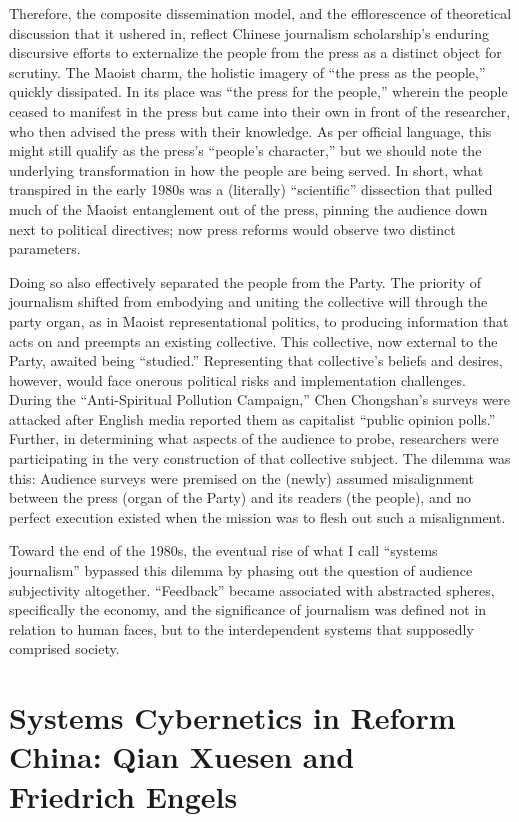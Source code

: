 \documentclass{tufte-handout}
\begin{document}
Therefore, the composite dissemination model, and the efflorescence of
theoretical discussion that it ushered in, reflect Chinese journalism
scholarship's enduring discursive efforts to externalize the people from
the press as a distinct object for scrutiny. The Maoist charm, the
holistic imagery of ``the press as the people,'' quickly dissipated. In
its place was ``the press for the people,'' wherein the people ceased to
manifest in the press but came into their own in front of the
researcher, who then advised the press with their knowledge. As per
official language, this might still qualify as the press's ``people's
character,'' but we should note the underlying transformation in how the
people are being served. In short, what transpired in the early 1980s
was a (literally) ``scientific'' dissection that pulled much of the
Maoist entanglement out of the press, pinning the audience down next to
political directives; now press reforms would observe two distinct
parameters.

Doing so also effectively separated the people from the Party. The
priority of journalism shifted from embodying and uniting the collective
will through the party organ, as in Maoist representational politics, to
producing information that acts on and preempts an existing collective.
This collective, now external to the Party, awaited being ``studied.''
Representing that collective's beliefs and desires, however, would face
onerous political risks and implementation challenges. During the
``Anti-Spiritual Pollution Campaign,'' Chen Chongshan's surveys were
attacked after English media reported them as capitalist ``public
opinion polls.'' Further, in determining what aspects of the audience to
probe, researchers were participating in the very construction of that
collective subject. The dilemma was this: Audience surveys were premised
on the (newly) assumed misalignment between the press (organ of the
Party) and its readers (the people), and no perfect execution existed
when the mission was to flesh out such a misalignment.

Toward the end of the 1980s, the eventual rise of what I call ``systems
journalism'' bypassed this dilemma by phasing out the question of
audience subjectivity altogether. ``Feedback'' became associated with
abstracted spheres, specifically the economy, and the significance of
journalism was defined not in relation to human faces, but to the
interdependent systems that supposedly comprised society.

\hypertarget{systems-cybernetics-in-reform-china-qian-xuesen-and-friedrich-engels}{%
\section{Systems Cybernetics in Reform China: Qian Xuesen and\\\noindent Friedrich
Engels}\label{systems-cybernetics-in-reform-china-qian-xuesen-and-friedrich-engels}}
\end{document}
